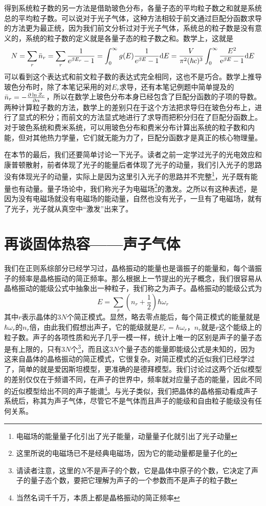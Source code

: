 \documentclass[../../main.tex]{subfiles}
\begin{document}
得到系统粒子数的另一方法是借助玻色分布，各量子态的平均粒子数之和就是系统总的平均粒子数。可以说对于光子气体，这种方法相较于前文通过巨配分函数求导的方法更为最正统，因为我们前文分析过对于光子气体，系统总的粒子数是没有意义的，系统的粒子数的定义就是各量子态的粒子数之和。数学上，这就是
\begin{equation}
    N=\sum_r \bar{n}_r=\sum_r \frac{1}{e^{\beta E_r}-1}=\int_0^{\infty}g(E)\frac{1}{e^{\beta E}-1}\dd E=\frac{V}{\pi^2(\hbar c)^3}\int_0^{\infty}\frac{E^2}{\mathrm{e}^{\beta E}-1}\dd E
\end{equation}
可以看到这个表达式和前文粒子数的表达式完全相同，这也不是巧合。数学上推导玻色分布时，除了本笔记采用的对\(E_r\)求导，还有本笔记例题中简单提及的\(\bar{n}_r=-\pdv{\ln\mathcal{Z}_r}{\alpha}\)，所以在数学上玻色分布本身已经包含了巨配分函数的子项的导数。两种计算粒子数的方法，数学上的差别只在于这个方法把求导归在玻色分布上，进行了显式的积分；而前文的方法显式地进行了求导而把积分归在了巨配分函数上。对于玻色系统和费米系统，可以用玻色分布和费米分布计算出系统的粒子数和内能，但对其他热力学量，它们就无能为力了，巨配分函数才是真正的核心物理量。

在本节的最后，我们还要简单讨论一下光子。读者之前一定学过光子的光电效应和康普顿散射，前者体现了光子的能量后者体现了光子的动量，我们引入光子的思路没有体现光子的动量，实际上是因为这里引入光子的思路并不完整\footnote{电磁场的能量量子化引出了光子能量，动量量子化就引出了光子动量}，光子既有能量也有动量。量子场论中，我们称光子为电磁场\footnote{这里所说的电磁场已不是经典电磁场，因为它的能动量都是量子化的}的激发。之所以有这种表述，是因为没有电磁场就没有电磁场的能动量，自然也没有光子，一旦有了电磁场，就有了光子，光子就从真空中“激发”出来了。

\section{再谈固体热容——声子气体}

我们在正则系综部分已经学习过，晶格振动的能量也是谐振子的能量和，每个谐振子的频率是晶格振动的简正频率。那么根据上一节提出的光子概念，我们很容易从晶格振动的能级公式中抽象出一种粒子，我们称之为声子。晶格振动的能级公式为
\begin{equation}
    E=\sum_{r}\left(n_{r}+\frac{1}{2}\right)\hbar\omega_{r}
\end{equation}
其中\(r\)表示晶体的\(3N\)个简正模式。显然，略去零点能后，每个简正模式的能量就是\(\hbar\omega_r\)的\(n_r\)倍，由此我们假想出声子，它的能级就是\(E_r=\hbar\omega_r\)，\(n_r\)就是\(r\)这个能级上的粒子数。声子的各项性质和光子几乎一模一样，统计上唯一的区别是声子的量子态是有上限的，只有\(3N\)个\footnote{请读者注意，这里的\(N\)不是声子的个数，它是晶体中原子的个数，它决定了声子的量子态个数，要把它理解为声子的一个参数而不是声子的粒子数}，而且这\(3N\)个量子态的能量即能级公式是未知的，因为这来自晶体的晶格振动的简正模式，它很复杂。对简正模式的近似我们已经学过了，简单的就是爱因斯坦模型，更准确的是德拜模型。我们讨论过这两个近似模型的差别仅仅在于频谱不同，在声子的世界中，频率就对应量子态的能量，因此不同的近似模型给出不同的声子能谱\footnote{当然名词千千万，本质上都是晶格振动的简正频率}。与光子类似，我们把晶体的晶格振动看成声子系统后，称其为声子气体，尽管它不是气体而且声子的能级和自由粒子能级没有任何关系。
\end{document}

